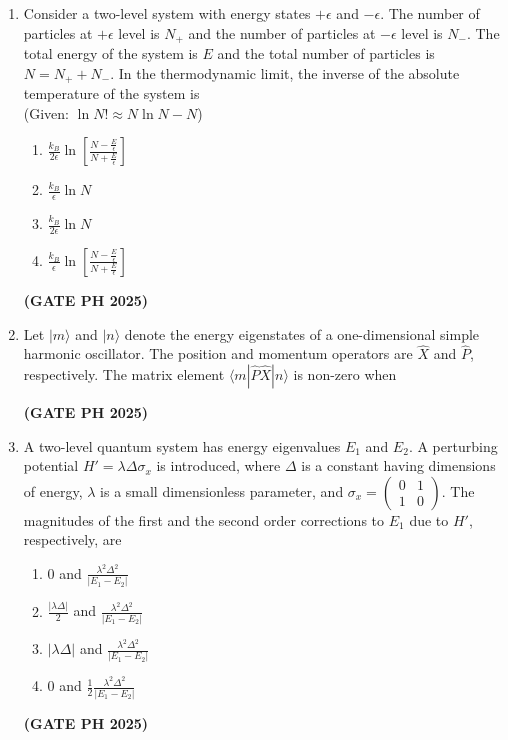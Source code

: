 \documentclass[14pt, a4paper]{extarticle}
\begin{document}
\begin{enumerate}[label=\textbf{Q.\arabic*}]
\item Consider a two-level system with energy states $+\epsilon$ and $-\epsilon$. The number of particles at $+\epsilon$ level is $N_+$ and the number of particles at $-\epsilon$ level is $N_-$. The total energy of the system is $E$ and the total number of particles is $N = N_+ + N_-$. In the thermodynamic limit, the inverse of the absolute temperature of the system is \\
(Given: $\ln N! \approx N\ln N - N$)
\begin{enumerate}
\item $\frac{k_B}{2\epsilon}\ln\left[\frac{N-\frac{E}{\epsilon}}{N+\frac{E}{\epsilon}}\right]$
\item $\frac{k_B}{\epsilon}\ln N$
\item $\frac{k_B}{2\epsilon}\ln N$
\item $\frac{k_B}{\epsilon}\ln\left[\frac{N-\frac{E}{\epsilon}}{N+\frac{E}{\epsilon}}\right]$
\end{enumerate}
\hfill \textbf{(GATE PH 2025)}

\item Let $|m\rangle$ and $|n\rangle$ denote the energy eigenstates of a one-dimensional simple harmonic oscillator. The position and momentum operators are $\hat{X}$ and $\hat{P}$, respectively. The matrix element $\langle m|\hat{P}\hat{X}|n\rangle$ is non-zero when
\begin{enumerate}
\end{enumerate}
\hfill \textbf{(GATE PH 2025)}

\item A two-level quantum system has energy eigenvalues $E_1$ and $E_2$. A perturbing potential $H' = \lambda\Delta\sigma_x$ is introduced, where $\Delta$ is a constant having dimensions of energy, $\lambda$ is a small dimensionless parameter, and $\sigma_x = \begin{pmatrix} 0 & 1 \\ 1 & 0 \end{pmatrix}$. The magnitudes of the first and the second order corrections to $E_1$ due to $H'$, respectively, are
\begin{enumerate}
\item $0$ and $\frac{\lambda^2\Delta^2}{|E_1-E_2|}$
\item $\frac{|\lambda\Delta|}{2}$ and $\frac{\lambda^2\Delta^2}{|E_1-E_2|}$
\item $|\lambda\Delta|$ and $\frac{\lambda^2\Delta^2}{|E_1-E_2|}$
\item $0$ and $\frac{1}{2}\frac{\lambda^2\Delta^2}{|E_1-E_2|}$
\end{enumerate}
\hfill \textbf{(GATE PH 2025)}


\end{enumerate}
\end{document}
